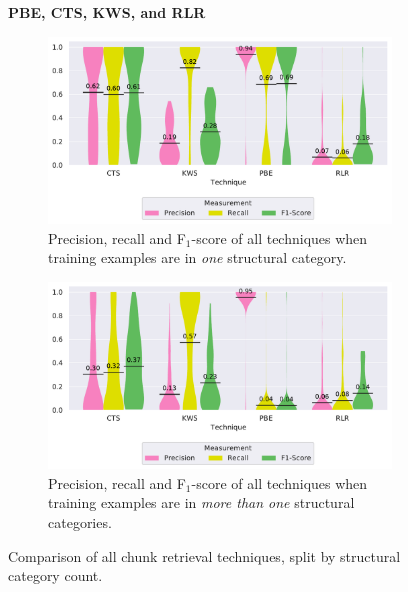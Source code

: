\begin{figure}
\centering
    \textbf{PBE, CTS, KWS, and RLR}\par\medskip
\begin{subfigure}[b]{\columnwidth}
		\centering
				\includegraphics[width=\columnwidth,
				clip]{img/big-study/recall-precision-singlecategory-all.pdf}
		\caption{Precision, recall and F$_{1}$-score of all
		techniques when training examples are in \emph{one}
		structural category.}
		\label{fig:recall-precision-singlecategory-all}
\end{subfigure}\hspace{\fill}
\begin{subfigure}[b]{\columnwidth}
		\centering
				\centering
		\includegraphics[width=\columnwidth,
		clip]{img/big-study/recall-precision-multicategory-all.pdf}
		\caption{Precision, recall and F$_{1}$-score of all
		techniques when training examples are in \emph{more than
		one} structural categories.}
		\label{fig:recall-precision-multicategory-all}
\end{subfigure}
\caption{Comparison of all chunk retrieval techniques, split by structural
category count.}
\end{figure}

